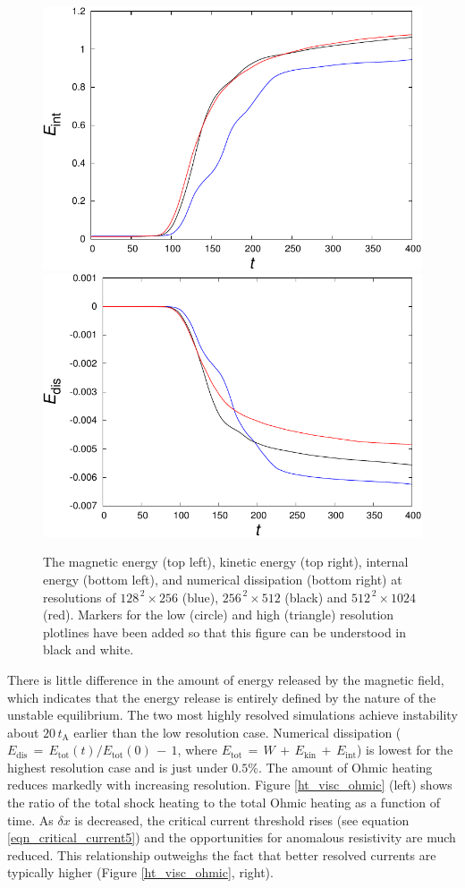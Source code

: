 \documentclass{./packages/rs/rsproca}
\begin{document}
\begin{figure}[h!]
  \includegraphics[scale=0.52]{./gnuplot/en_int}
  \includegraphics[scale=0.52]{./gnuplot/en_dis}
  \caption{\small{The magnetic energy (top left), kinetic energy (top right), internal energy (bottom left), and numerical dissipation (bottom right) at resolutions of $128^{\,2} \times 256$ (blue), $256^{\,2} \times 512$ (black) and $512^{\,2} \times 1024$ (red). Markers for the low (circle) and high (triangle) resolution plotlines have been added so that this figure can be understood in black and white.}}
  \label{en}
\end{figure}
There is little difference in the amount of energy released by the magnetic field, which indicates that the energy release is entirely defined by the nature of the unstable equilibrium. The two most highly resolved simulations achieve instability about $20\,t_{\mathrm{A}}$ earlier than the low resolution case. Numerical dissipation ($E_{\mathrm{dis}}\,{=}\,E_{\mathrm{tot}}(t)/E_{\mathrm{tot}}(0)\,-\,1$, where $E_{\mathrm{tot}}\,=\,W\,+\,E_{\mathrm{kin}}\,+\,E_{\mathrm{int}}$) is lowest for the highest resolution case and is just under $0.5\%$. The amount of Ohmic heating reduces markedly with increasing resolution. Figure \ref{ht_visc_ohmic} (left) shows the ratio of the total shock heating to the total Ohmic heating as a function of time. As $\delta x$ is decreased, the critical current threshold rises (see equation \ref{eqn_critical_current5}) and the opportunities for anomalous resistivity are much reduced. This relationship outweighs the fact that better resolved currents are typically higher (Figure \ref{ht_visc_ohmic}, right).
\end{document}
